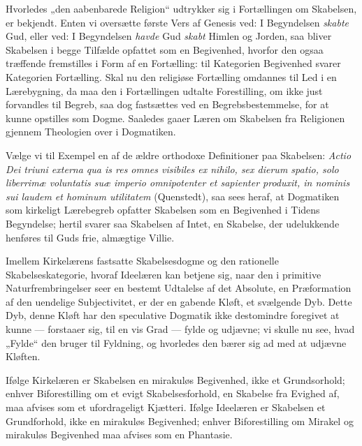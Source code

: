 \documentclass[12pt]{book}
\newcommand{\opage}[1]{\marginnote{\footnotesize\textit{[#1]}}}
\begin{document}
Hvorledes „den aabenbarede Religion“ udtrykker sig i
Fortællingen om Skabelsen, er bekjendt. Enten vi oversætte
første Vers af Genesis ved: I Begyndelsen \emph{skabte} Gud,
eller ved: I Begyndelsen \emph{havde} Gud \emph{skabt} Himlen og
Jorden, saa bliver Skabelsen i begge Tilfælde opfattet som en
Begivenhed, hvorfor den ogsaa træffende fremstilles i Form
af en Fortælling: til Kategorien Begivenhed svarer Kategorien
Fortælling. Skal nu den religiøse Fortælling omdannes til
Led i en Lærebygning, da maa den i Fortællingen udtalte
Forestilling, om ikke just forvandles til Begreb, saa dog
fastsættes ved en Begrebsbestemmelse, for at kunne opstilles
som Dogme. Saaledes gaaer Læren om Skabelsen fra Religionen
gjennem Theologien over i Dogmatiken.

Vælge vi til Exempel en af de ældre orthodoxe Definitioner
paa Skabelsen: \textit{Actio Dei triuni externa qua is
res omnes visibiles ex nihilo, sex dierum spatio, solo
liberrimæ voluntatis suæ imperio omnipotenter et sapienter
produxit, in nominis sui laudem et hominum
utilitatem} (Quenstedt), saa sees heraf, at Dogmatiken som
kirkeligt Lærebegreb opfatter Skabelsen som en Begivenhed i
Tidens Begyndelse; hertil svarer saa Skabelsen af Intet, en
Skabelse, der udelukkende henføres til Guds frie, almægtige
Villie.

Imellem Kirkelærens fastsatte Skabelsesdogme og den
rationelle Skabelseskategorie, hvoraf Ideelæren kan betjene sig,
naar den i primitive Naturfrembringelser seer en bestemt Udtalelse
af det Absolute, en Præformation af den uendelige
Subjectivitet, er der en gabende Kløft, et svælgende Dyb.
\opage{151}Dette Dyb, denne Kløft har den speculative Dogmatik ikke
destomindre foregivet at kunne --- forstaaer sig, til en vis
Grad --- fylde og udjævne; vi skulle nu see, hvad „Fylde“
den bruger til Fyldning, og hvorledes den bærer sig ad med
at udjævne Kløften.

Ifølge Kirkelæren er Skabelsen en mirakuløs Begivenhed,
ikke et Grundsorhold; %
enhver Biforestilling om et evigt Skabelsesforhold,
en Skabelse fra Evighed af, maa afvises som
et ufordrageligt Kjætteri. Ifølge Ideelæren er Skabelsen et
Grundforhold, ikke en mirakuløs Begivenhed; enhver Biforestilling
om Mirakel og mirakuløs Begivenhed maa afvises som
en Phantasie.
\end{document}

